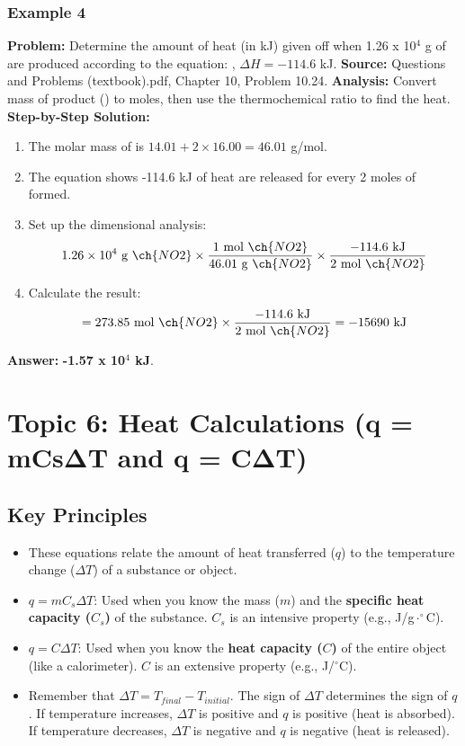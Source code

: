 \documentclass{article}
\begin{document}
\subsubsection{Example 4}
\textbf{Problem:} Determine the amount of heat (in kJ) given off when 1.26 x 10$^4$ g of  are produced according to the equation: , $\Delta H = -114.6$ kJ.
\textbf{Source:} Questions and Problems (textbook).pdf, Chapter 10, Problem 10.24.
\textbf{Analysis:} Convert mass of product () to moles, then use the thermochemical ratio to find the heat.
\textbf{Step-by-Step Solution:}
\begin{enumerate}
    \item The molar mass of  is $14.01 + 2 \times 16.00 = 46.01$ g/mol.
    \item The equation shows -114.6 kJ of heat are released for every 2 moles of  formed.
    \item Set up the dimensional analysis:
    \[ 1.26 \times 10^4 \text{ g } \ch{NO2} \times \frac{1 \text{ mol } \ch{NO2}}{46.01 \text{ g } \ch{NO2}} \times \frac{-114.6 \text{ kJ}}{2 \text{ mol } \ch{NO2}} \]
    \item Calculate the result:
    \[ = 273.85 \text{ mol } \ch{NO2} \times \frac{-114.6 \text{ kJ}}{2 \text{ mol } \ch{NO2}} = -15690 \text{ kJ} \]
\end{enumerate}
\textbf{Answer:} \textbf{-1.57 x 10$^4$ kJ}.

\section{Topic 6: Heat Calculations (q = mCsΔT and q = CΔT)}
\subsection{Key Principles}
\begin{itemize}
    \item These equations relate the amount of heat transferred ($q$) to the temperature change ($\Delta T$) of a substance or object.
    \item \textbf{$q = mC_s\Delta T$}: Used when you know the mass ($m$) and the \textbf{specific heat capacity ($C_s$)} of the substance. $C_s$ is an intensive property (e.g., J/g$\cdot^\circ$C).
    \item \textbf{$q = C\Delta T$}: Used when you know the \textbf{heat capacity ($C$)} of the entire object (like a calorimeter). $C$ is an extensive property (e.g., J/$^\circ$C).
    \item Remember that $\Delta T = T_{final} - T_{initial}$. The sign of $\Delta T$ determines the sign of $q$. If temperature increases, $\Delta T$ is positive and $q$ is positive (heat is absorbed). If temperature decreases, $\Delta T$ is negative and $q$ is negative (heat is released).
\end{itemize}
\end{document}
